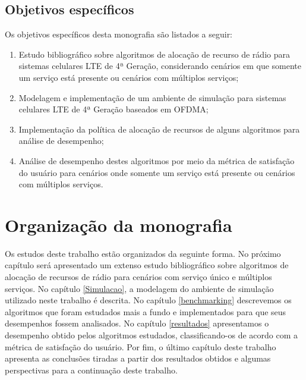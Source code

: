 \subsection{Objetivos específicos}

Os objetivos específicos desta monografia são listados a seguir:

\begin{enumerate}
\item Estudo bibliográfico sobre algoritmos de alocação de recurso de rádio para sistemas celulares LTE de 4ª Geração, considerando cenários em que somente um serviço está presente ou cenários com múltiplos serviços;	 
\item Modelagem e implementação de um ambiente de simulação para sistemas celulares LTE de 4ª Geração baseados em {OFDMA}; 
\item Implementação da política de alocação de recursos de alguns algoritmos para análise de desempenho;
\item Análise de desempenho destes algoritmos por meio da métrica de satisfação do usuário para cenários onde somente um serviço está presente ou cenários com múltiplos serviços.
\end{enumerate}

\section{Organização da monografia}

Os estudos deste trabalho estão organizados da seguinte forma. No próximo capítulo será apresentado um extenso estudo bibliográfico sobre algoritmos de alocação de recursos de rádio para cenários com serviço único e múltiplos serviços. No capítulo \ref{Simulacao}, a modelagem do ambiente de simulação utilizado neste trabalho é descrita. No capítulo \ref{benchmarking} descrevemos os algoritmos que foram estudados mais a fundo e implementados para que seus desempenhos fossem analisados. No capítulo \ref{resultados} apresentamos o desempenho obtido pelos algoritmos estudados, classificando-os de acordo com a métrica de satisfação do usuário. Por fim, o último capítulo deste trabalho apresenta as conclusões tiradas a partir dos resultados obtidos e algumas perspectivas para a continuação deste trabalho. 